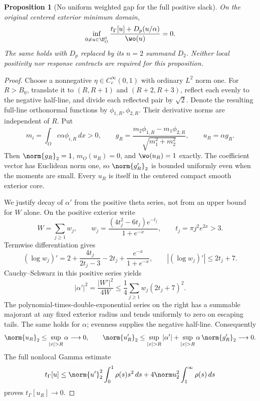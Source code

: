 \documentclass[11pt,a4paper]{article}
\numberwithin{equation}{section}
\newtheorem{proposition}[theorem]{Proposition}
\theoremstyle{definition}\newtheorem{definition}[theorem]{Definition}
\theoremstyle{remark}\newtheorem{remark}[theorem]{Remark}
\newcommand{\tg}{t_\Gamma}\newcommand{\cg}{c_\Gamma}
\begin{document}
\begin{proposition}[No uniform weighted gap for the full positive slack]\label{c:prop:nogap}
On the original centered exterior minimum domain,
\begin{equation}\label{c:eq:nogap}
 \inf_{0\ne u\in\D_O^0}
 \frac{\tg[u]+D_p(u/\alpha)}{\wo(u)}=0.
\end{equation}
The same holds with $D_p$ replaced by its $n=2$ summand $D_2$.
Neither local positivity nor response contracts are required for this proposition.
\end{proposition}
\begin{proof}
Choose a nonnegative $\eta\in C_c^\infty(0,1)$ with ordinary $L^2$ norm one.
For $R>{B_0}$, translate it to $(R,R+1)$ and $(R+2,R+3)$, reflect each evenly to the negative half-line, and divide each reflected pair by $\sqrt2$.
Denote the resulting full-line orthonormal functions by $\phi_{1,R},\phi_{2,R}$.
Their derivative norms are independent of $R$.
Put
\[
 m_i=\int_O c\alpha\phi_{i,R}\,dx>0,\qquad
 g_R=\frac{m_2\phi_{1,R}-m_1\phi_{2,R}}{\sqrt{m_1^2+m_2^2}},
 \qquad u_R=\alpha g_R.
\]
Then $\norm{g_R}_2=1$, $m_O(u_R)=0$, and $\wo(u_R)=1$ exactly.
The coefficient vector has Euclidean norm one, so $\norm{g_R'}_2$ is bounded uniformly even when the moments are small.
Every $u_R$ is itself in the centered compact smooth exterior core.

We justify decay of $\alpha'$ from the positive theta series, not from an upper bound for $W$ alone.
On the positive exterior write
\[
 W=\sum_{j\ge1}w_j,\qquad
 w_j=\frac{(4t_j^2-6t_j)e^{-t_j}}{1+e^{-x}},\qquad
 t_j=\pi j^2e^{2x}>3.
\]
Termwise differentiation gives
\[
 (\log w_j)'=2+\frac{4t_j}{2t_j-3}-2t_j+
 \frac{e^{-x}}{1+e^{-x}},\qquad
 |(\log w_j)'|\le2t_j+7.
\]
Cauchy--Schwarz in this positive series yields
\begin{equation}\label{c:eq:alphaprimedecay}
 |\alpha'|^2=\frac{|W'|^2}{4W}
 \le\frac14\sum_{j\ge1}w_j(2t_j+7)^2.
\end{equation}
The polynomial-times-double-exponential series on the right has a summable majorant at any fixed exterior radius and tends uniformly to zero on escaping tails. The same holds for $\alpha$; evenness supplies the negative half-line.
Consequently
\[
 \norm{u_R}_2\le\sup_{|x|>R}\alpha\longrightarrow0,\qquad
 \norm{u_R'}_2\le\sup_{|x|>R}|\alpha'|
 +\sup_{|x|>R}\alpha\,\norm{g_R'}_2\longrightarrow0.
\]
The full nonlocal Gamma estimate
\[
 \tg[u]\le\norm{u'}_2^2\int_0^1\rho(s)s^2\,ds
 +4\norm u_2^2\int_1^\infty\rho(s)\,ds
\]
proves $\tg[u_R]\to0$.


\end{proof}
\end{document}
